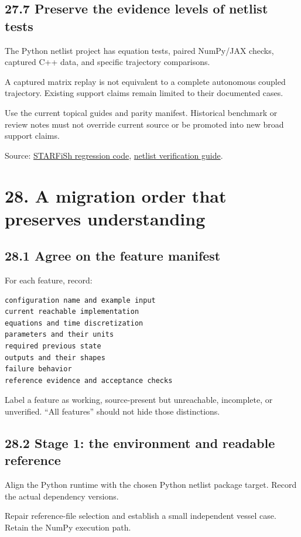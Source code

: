 \documentclass[11pt,a4paper]{article}
\begin{document}
\subsection{27.7 Preserve the evidence levels of netlist tests}
The Python netlist project has equation tests, paired NumPy/JAX checks, captured C++ data, and specific trajectory comparisons.

A captured matrix replay is not equivalent to a complete autonomous coupled trajectory. Existing support claims remain limited to their documented cases.

Use the current topical guides and parity manifest. Historical benchmark or review notes must not override current source or be promoted into new broad support claims.

Source: \href{/home/sadid/starfish/UnitTesting/unitTest_singleVessel.py}{STARFiSh regression code}, \href{/home/sadid/crimson/cfs_reg/CRIMSONFlowsolver/flowsolver/netlist_py/docs/NETLIST_SOLVER_DEVELOPER_GUIDE.md}{netlist verification guide}.

\clearpage
\section{28. A migration order that preserves understanding}
\subsection{28.1 Agree on the feature manifest}
For each feature, record:


\begin{lstlisting}
configuration name and example input
current reachable implementation
equations and time discretization
parameters and their units
required previous state
outputs and their shapes
failure behavior
reference evidence and acceptance checks
\end{lstlisting}
Label a feature as working, source-present but unreachable, incomplete, or unverified. \textquotedblleft{}All features\textquotedblright{} should not hide those distinctions.

\subsection{28.2 Stage 1: the environment and readable reference}
Align the Python runtime with the chosen Python netlist package target. Record the actual dependency versions.

Repair reference-file selection and establish a small independent vessel case. Retain the NumPy execution path.
\end{document}
